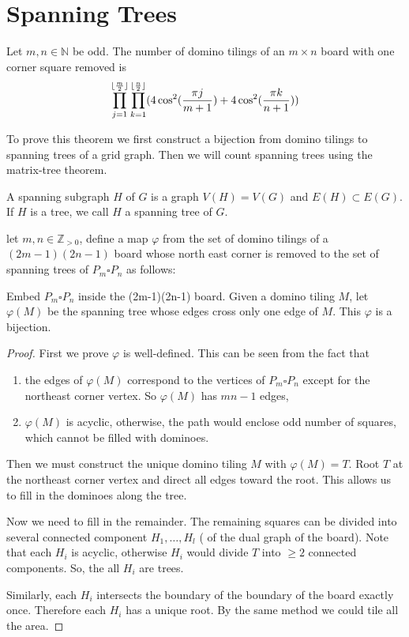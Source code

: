 \section{Spanning Trees}
\begin{theorem}
Let $m,n\in\mathbb{N}$ be odd. The number of domino tilings of an $m\times n$ board with one corner square removed is 
$$\prod_{j=1}^{\lfloor\frac{m}{2}\rfloor}\prod_{k=1}^{\lfloor\frac{n}{2}\rfloor}(4\cos^2(\frac{\pi j}{m+1})+4\cos^2(\frac{\pi k}{n+1}))$$
\end{theorem}
To prove this theorem we first construct a bijection from domino tilings to spanning trees of a grid graph. Then we will count spanning trees using the matrix-tree theorem.
\begin{definition}
A spanning subgraph $H$ of $G$ is a graph $V(H)=V(G)$ and $E(H)\subset E(G)$. If $H$ is a tree, we call $H$ a spanning tree of $G$.
\end{definition}
\begin{theorem}
let $m,n\in\mathbb{Z}_{>0}$, define a map $\varphi$ from the set of domino tilings of a $(2m-1)(2n-1)$ board whose north east corner is removed to the set of spanning trees of $P_m\square P_n$ as follows: 

Embed $P_m\square P_n$ inside the (2m-1)(2n-1) board. Given a domino tiling $M$, let $\varphi(M)$ be the spanning tree whose edges cross only one edge of $M$. This $\varphi$ is a bijection.
\end{theorem}
\begin{proof}
First we prove $\varphi$ is well-defined. This can be seen from the fact that 
\begin{enumerate}
\item the edges of $\varphi(M)$ correspond to  the vertices of $P_m\square P_n$ except for the northeast corner vertex. So $\varphi(M)$ has $mn-1$ edges,
\item $\varphi(M)$ is acyclic, otherwise, the path would enclose odd number of squares, which cannot be filled with dominoes.
\end{enumerate}

Then we must construct the unique domino tiling $M$ with $\varphi(M)=T$.
Root $T$ at the northeast corner vertex and direct all edges toward the root. This allows us to fill in the dominoes along the tree. 

Now we need to fill in the remainder. The remaining squares can be divided into several connected component $H_1,\ldots, H_l$ ( of the dual graph of the board). Note that each $H_i$ is acyclic, otherwise $H_i$ would divide $T$ into $\geq 2$ connected components. So, the all $H_i$ are trees.

Similarly, each $H_i$ intersects the boundary of the boundary of the board exactly once. Therefore each $H_i$ has a unique root. By the same method we could tile all the area.
\end{proof}